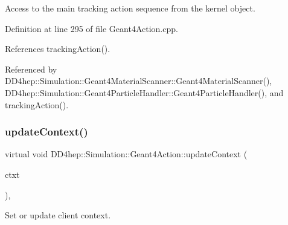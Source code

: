 Access to the main tracking action sequence from the kernel object. 



Definition at line 295 of file Geant4\+Action.\+cpp.



References tracking\+Action().



Referenced by D\+D4hep\+::\+Simulation\+::\+Geant4\+Material\+Scanner\+::\+Geant4\+Material\+Scanner(), D\+D4hep\+::\+Simulation\+::\+Geant4\+Particle\+Handler\+::\+Geant4\+Particle\+Handler(), and tracking\+Action().

\hypertarget{class_d_d4hep_1_1_simulation_1_1_geant4_action_ae3b9daf2af881df956c46568c0743313}{}\label{class_d_d4hep_1_1_simulation_1_1_geant4_action_ae3b9daf2af881df956c46568c0743313} 
\subsubsection{\texorpdfstring{update\+Context()}{updateContext()}}
{\footnotesize\ttfamily virtual void D\+D4hep\+::\+Simulation\+::\+Geant4\+Action\+::update\+Context (\begin{DoxyParamCaption}\item[{\hyperlink{class_d_d4hep_1_1_simulation_1_1_geant4_context}{Geant4\+Context} $\ast$}]{ctxt }\end{DoxyParamCaption})\hspace{0.3cm}{\ttfamily [inline]}, {\ttfamily [virtual]}}



Set or update client context. 



